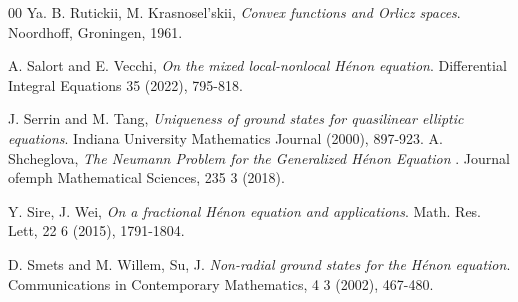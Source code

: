 \documentclass[leqno,twoside, 12pt]{amsart}
\theoremstyle{plain}
\numberwithin{equation}{section} \numberwithin{figure}{section}
\theoremstyle{definition}
\numberwithin{equation}{section}
\begin{document}
\begin{thebibliography}{00}
Ya. B. Rutickii, M. Krasnosel’skii, \emph{Convex functions and Orlicz spaces}. Noordhoff, Groningen, 1961.

 A. Salort and E. Vecchi, \emph{On the mixed local-nonlocal H\'enon equation}. Differential Integral Equations 35 (2022), 795-818.

J. Serrin and   M. Tang, \emph{Uniqueness of ground states for quasilinear elliptic equations}. Indiana University Mathematics Journal (2000), 897-923.
 A. Shcheglova, \emph{The Neumann Problem for the Generalized H\'enon Equation} . Journal ofemph{ Mathematical Sciences, 2}35 3 (2018).
 
 Y. Sire, J.  Wei,  \emph{On a fractional H\'enon equation and applications}. Math. Res. Lett, 22 6 (2015), 1791-1804.
 
D. Smets and M. Willem,  Su, J. \emph{Non-radial ground states for the H\'enon equation}. Communications in Contemporary Mathematics, 4 3 (2002), 467-480.





\end{thebibliography}
\end{document}
